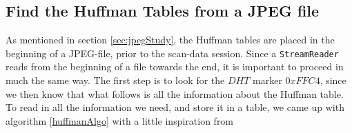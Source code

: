 \subsection*{Find the Huffman Tables from a JPEG file}
\label{sec:DesignHuffman}
As mentioned in section \ref{sec:jpegStudy}, the Huffman tables are placed in the beginning of a JPEG-file, prior to the scan-data session. 
Since a \lstinline|StreamReader| reads from the beginning of a file towards the end, it is important to proceed in much the same way. 
The first step is to look for the $DHT$ marker $0xFFC4$, since we then know that what follows is all the information about the Huffman table. 
To read in all the information we need, and store it in a table, we came up with algorithm \ref{huffmanAlgo} with a little inspiration from \cite{HuffmanDecoding}

